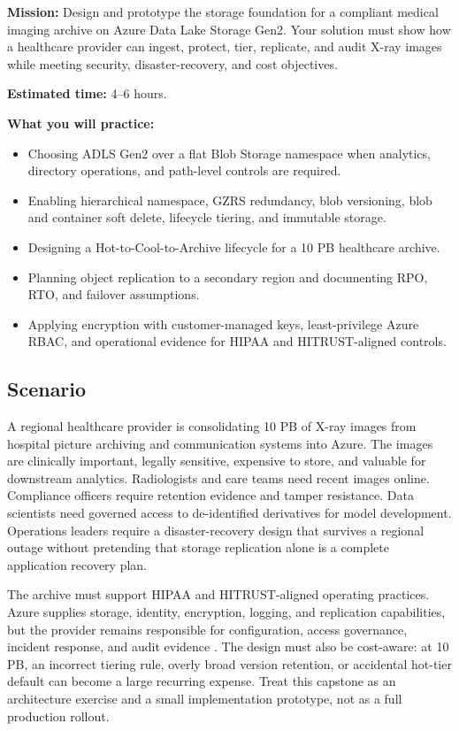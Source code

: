 \begin{capstonebox}
\textbf{Mission:} Design and prototype the storage foundation for a compliant medical imaging archive on Azure Data Lake Storage Gen2. Your solution must show how a healthcare provider can ingest, protect, tier, replicate, and audit X-ray images while meeting security, disaster-recovery, and cost objectives.

\textbf{Estimated time:} 4--6 hours.

\textbf{What you will practice:}
\begin{itemize}
    \item Choosing ADLS Gen2 over a flat Blob Storage namespace when analytics, directory operations, and path-level controls are required.
    \item Enabling hierarchical namespace, GZRS redundancy, blob versioning, blob and container soft delete, lifecycle tiering, and immutable storage.
    \item Designing a Hot-to-Cool-to-Archive lifecycle for a 10 PB healthcare archive.
    \item Planning object replication to a secondary region and documenting RPO, RTO, and failover assumptions.
    \item Applying encryption with customer-managed keys, least-privilege Azure RBAC, and operational evidence for HIPAA and HITRUST-aligned controls.
\end{itemize}
\end{capstonebox}

\subsection*{Scenario}
A regional healthcare provider is consolidating 10 PB of X-ray images from hospital picture archiving and communication systems into Azure. The images are clinically important, legally sensitive, expensive to store, and valuable for downstream analytics. Radiologists and care teams need recent images online. Compliance officers require retention evidence and tamper resistance. Data scientists need governed access to de-identified derivatives for model development. Operations leaders require a disaster-recovery design that survives a regional outage without pretending that storage replication alone is a complete application recovery plan.

The archive must support HIPAA and HITRUST-aligned operating practices. Azure supplies storage, identity, encryption, logging, and replication capabilities, but the provider remains responsible for configuration, access governance, incident response, and audit evidence \cite{microsoft2025hipaa}. The design must also be cost-aware: at 10 PB, an incorrect tiering rule, overly broad version retention, or accidental hot-tier default can become a large recurring expense. Treat this capstone as an architecture exercise and a small implementation prototype, not as a full production rollout.

